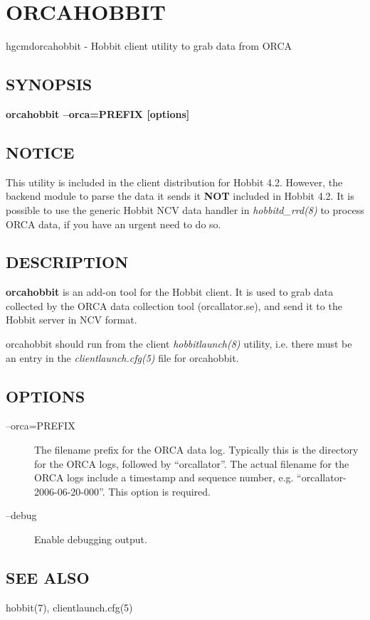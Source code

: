  
  

%


\newpage
\section{ORCAHOBBIT}

hgcmd{orcahobbit} - Hobbit client utility to grab data from ORCA

 \subsection{SYNOPSIS}
\textbf{orcahobbit --orca=PREFIX [options]}


 
\subsection{NOTICE}
 This utility is included in the client distribution for Hobbit 4.2. However, the backend module to parse the data it sends it \textbf{NOT}
 included in Hobbit 4.2. It is possible to use the generic Hobbit NCV data handler in \emph{hobbitd\_rrd(8)}
 to process ORCA data, if you have an urgent need to do so. 

 
\subsection{DESCRIPTION}
\textbf{orcahobbit}
 is an add-on tool for the Hobbit client. It is used to grab data collected by the ORCA data collection tool (orcallator.se), and send it to the Hobbit server in NCV format. 

  orcahobbit should run from the client \emph{hobbitlaunch(8)}
 utility, i.e. there must be an entry in the \emph{clientlaunch.cfg(5)}
 file for orcahobbit. 


 
\subsection{OPTIONS}
\begin{description}
\item[--orca=PREFIX] The filename prefix for the ORCA data log. Typically this is the directory for the ORCA logs, followed by ``orcallator''. The actual filename for the ORCA logs include a timestamp and sequence number, e.g. ``orcallator-2006-06-20-000''. This option is required. 

 

\item[--debug] Enable debugging output. 

 


\end{description}
\subsection{SEE ALSO}
hobbit(7), clientlaunch.cfg(5) 

 


  
